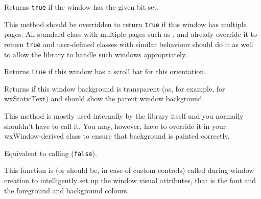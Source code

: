 Returns \texttt{true} if the window has the given  bit set.


\label{wxwindowhasmultiplepages}


This method should be overridden to return \texttt{true} if this window has
multiple pages. All standard class with multiple pages such as 
,  and 
 already override it to return \texttt{true}
and user-defined classes with similar behaviour should do it as well to allow
the library to handle such windows appropriately.


\label{wxwindowhasscrollbar}


Returns {\tt true} if this window has a scroll bar for this orientation.




\label{wxwindowhastransparentbackground}


Returns \true if this window background is transparent (as, for example, for
wxStaticText) and should show the parent window background.

This method is mostly used internally by the library itself and you normally
shouldn't have to call it. You may, however, have to override it in your
wxWindow-derived class to ensure that background is painted correctly.


\label{wxwindowhide}


Equivalent to calling ({\tt false}).


\label{wxwindowinheritattributes}


This function is (or should be, in case of custom controls) called during
window creation to intelligently set up the window visual attributes, that is
the font and the foreground and background colours.

